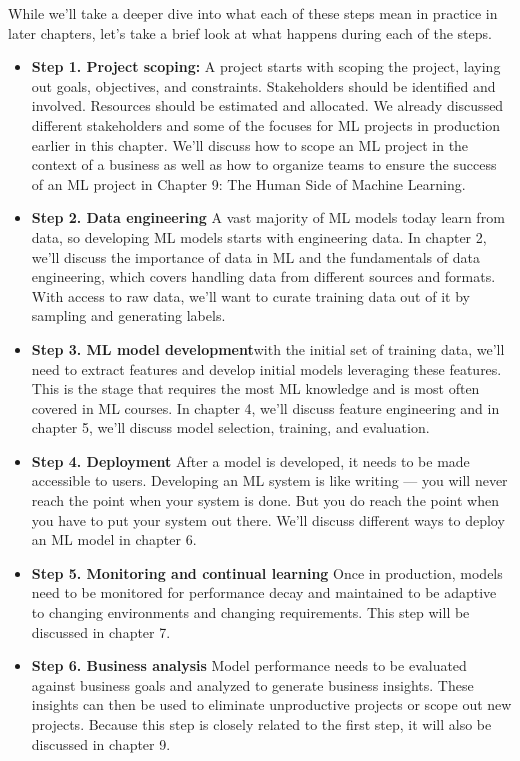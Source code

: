 \documentclass[openany]{book}
\begin{document}
While we’ll take a deeper dive into what each of these steps mean in practice in later chapters, let’s take a brief look at what happens during each of the steps. 


\begin{itemize}
    \item \textbf{Step 1. Project scoping: } A project starts with scoping the project, laying out goals, objectives, and constraints. Stakeholders should be identified and involved. Resources should be estimated and allocated. We already discussed different stakeholders and some of the focuses for ML projects in production earlier in this chapter. We’ll discuss how to scope an ML project in the context of a business as well as how to organize teams to ensure the success of an ML project in Chapter 9: The Human Side of Machine Learning.

    \item \textbf{Step 2. Data engineering} A vast majority of ML models today learn from data, so developing ML models starts with engineering data. In chapter 2, we’ll discuss the importance of data in ML and the fundamentals of data engineering, which covers handling data from different sources and formats. With access to raw data, we’ll want to curate training data out of it by sampling and generating labels.

    \item \textbf{Step 3. ML model development}with the initial set of training data, we’ll need to extract features and develop initial models leveraging these features. This is the stage that requires the most ML knowledge and is most often covered in ML courses. In chapter 4, we’ll discuss feature engineering and in chapter 5, we’ll discuss model selection, training, and evaluation.

    \item \textbf{Step 4. Deployment} After a model is developed, it needs to be made accessible to users. Developing an ML system is like writing — you will never reach the point when your system is done. But you do reach the point when you have to put your system out there. We’ll discuss different ways to deploy an ML model in chapter 6.

    \item \textbf{Step 5. Monitoring and continual learning} Once in production, models need to be monitored for performance decay and maintained to be adaptive to changing environments and changing requirements. This step will be discussed in chapter 7.

    \item \textbf{Step 6. Business analysis} Model performance needs to be evaluated against business goals and analyzed to generate business insights. These insights can then be used to eliminate unproductive projects or scope out new projects. Because this step is closely related to the first step, it will also be discussed in chapter 9.

    

\end{itemize}
\end{document}
